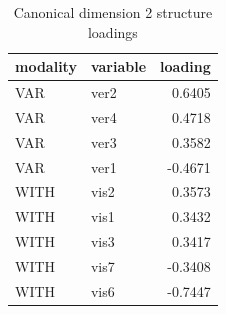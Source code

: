 \begin{table}
\caption{Canonical dimension 2 structure loadings}
\label{tab:cca_dimension_2_loadings}
\begin{tabular}{llr}
\toprule
modality & variable & loading \\
\midrule
VAR & ver2 & 0.6405 \\
VAR & ver4 & 0.4718 \\
VAR & ver3 & 0.3582 \\
VAR & ver1 & -0.4671 \\
WITH & vis2 & 0.3573 \\
WITH & vis1 & 0.3432 \\
WITH & vis3 & 0.3417 \\
WITH & vis7 & -0.3408 \\
WITH & vis6 & -0.7447 \\
\bottomrule
\end{tabular}
\end{table}
